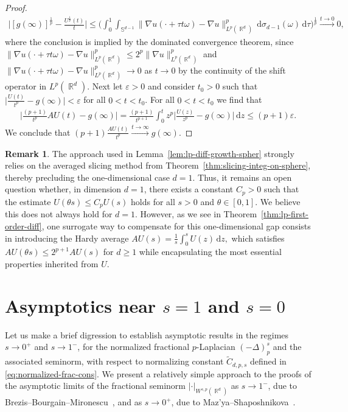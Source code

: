 \documentclass[12pt, reqno]{amsart}%
\theoremstyle{plain}  %
\theoremstyle{definition}  %
\newtheorem{remark}[theorem]{Remark}   %
\theoremstyle{remark}
\numberwithin{equation}{section}
\DeclareMathOperator{\R}{\mathbb{R}}
\renewcommand{\d}{\,\mathrm{d}}
\begin{document}
\begin{proof}
\begin{align*} 
\Big|[g(\infty)]^{\frac{1}{p}}
-\frac{U^{\frac{1}{p}}(t)}{t} \Big|
\leq \Big( \int_0^1 \int_{\mathbb{S}^{d-1}} \|\nabla u(\cdot + \tau t\omega)-\nabla u\|^p_{L^p(\R^d)}  \d\sigma_{d-1}(\omega) \d \tau\Big)^{\frac{1}{p}}\xrightarrow{t\to0}0,
\end{align*}
where the conclusion is implied by the  dominated convergence theorem, since $\|\nabla u(\cdot + \tau t\omega)-\nabla u\|^p_{L^p(\R^d)} \leq 2^p\|\nabla u\|^p_{L^p(\R^d)}$ and
$\|\nabla u(\cdot + \tau t\omega) - \nabla u\|^p_{L^p(\R^d)} \to 0$ as $t \to 0$  by the continuity of the shift operator in  $L^p(\R^d)$. Next let  $\varepsilon>0$ and consider $t_0>0$ such that $\big|\frac{U(t)}{t^p} -g(\infty)\big|<\varepsilon$  for all $0<t<t_0$. For all $0<t<t_0$ we find that
\begin{align*}
 \Big |\frac{(p+1)}{t^p}AU(t) -g(\infty)\Big|= \frac{(p+1)}{t^{p+1}}\int_0^t z^p\Big|\frac{U(z) }{z^p}-g(\infty)\Big|\d z
\leq (p+1)\varepsilon.
\end{align*}
We conclude that $(p+1)\frac{AU(t)}{t^p}\xrightarrow{t\to\infty} g(\infty)$.
\end{proof}
\begin{remark}\label{rem:almost increasing}
The approach used in Lemma~\ref{lem:lp-diff-growth-spher} strongly relies on the averaged slicing method from Theorem~\ref{thm:slicing-integ-on-sphere}, thereby precluding the one-dimensional case $d=1$. Thus, it remains an open question whether, in dimension $d=1$, there exists a constant $C_p>0$ such that the estimate
$U(\theta s) \leq C_p U(s)$ holds for all $s>0$ and $\theta \in [0,1]$. We believe this does not always hold for $d=1$. However, as we see in Theorem~\ref{thm:lp-first-order-diff}, one surrogate way to compensate for this one-dimensional gap consists in introducing the Hardy average 
$AU(s) = \frac{1}{s} \int_0^s U(z)\d z,$ 
which satisfies $AU(\theta s)\leq 2^{p+1}AU(s)$ for $d\geq 1$ while encapsulating the most essential properties inherited from $U$.
\end{remark}



\section{Asymptotics near $s=1$ and $s=0$}
\label{sec:assymp-s-near-1-0}
Let us  make a brief digression to establish asymptotic results in the regimes $s \to 0^+$ and $s \to 1^-$, for the normalized fractional $p$-Laplacian $(-\Delta)^s_p$ and the associated seminorm, with respect to normalizing  constant $\widetilde{C}_{d,p,s}$ defined in \eqref{eq:normalized-frac-cons}. We present a relatively simple approach to the proofs of the asymptotic limits of the fractional seminorm $ |\cdot|_{W^{s,p}(\R^d)} $ as $ s \to 1^- $, due to Brezis--Bourgain--Mironescu~\cite{BBM01}, and as $s \to 0^+ $, due to Maz'ya--Shaposhnikova~\cite{MS02}.
\end{document}
